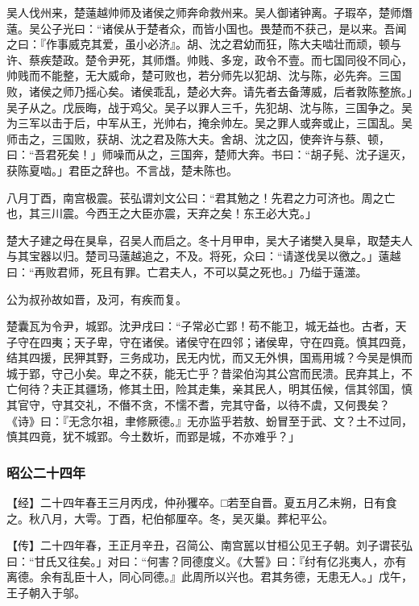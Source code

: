 \documentclass[]{article}
\begin{document}
吴人伐州来，楚薳越帅师及诸侯之师奔命救州来。吴人御诸钟离。子瑕卒，楚师熸薳。吴公子光曰：``诸侯从于楚者众，而皆小国也。畏楚而不获己，是以来。吾闻之曰：『作事威克其爱，虽小必济』。胡、沈之君幼而狂，陈大夫啮壮而顽，顿与许、蔡疾楚政。楚令尹死，其师熸。帅贱、多宠，政令不壹。而七国同役不同心，帅贱而不能整，无大威命，楚可败也，若分师先以犯胡、沈与陈，必先奔。三国败，诸侯之师乃摇心矣。诸侯乖乱，楚必大奔。请先者去备薄威，后者敦陈整旅。」吴子从之。戊辰晦，战于鸡父。吴子以罪人三千，先犯胡、沈与陈，三国争之。吴为三军以击于后，中军从王，光帅右，掩余帅左。吴之罪人或奔或止，三国乱。吴师击之，三国败，获胡、沈之君及陈大夫。舍胡、沈之囚，使奔许与蔡、顿，曰：``吾君死矣！」师噪而从之，三国奔，楚师大奔。书曰：``胡子髡、沈子逞灭，获陈夏啮。」君臣之辞也。不言战，楚未陈也。

八月丁酉，南宫极震。苌弘谓刘文公曰：``君其勉之！先君之力可济也。周之亡也，其三川震。今西王之大臣亦震，天弃之矣！东王必大克。」

楚大子建之母在狊阜，召吴人而启之。冬十月甲申，吴大子诸樊入狊阜，取楚夫人与其宝器以归。楚司马薳越追之，不及。将死，众曰：``请遂伐吴以徼之。」薳越曰：``再败君师，死且有罪。亡君夫人，不可以莫之死也。」乃缢于薳澨。

公为叔孙故如晋，及河，有疾而复。

楚囊瓦为令尹，城郢。沈尹戌曰：``子常必亡郢！苟不能卫，城无益也。古者，天子守在四夷；天子卑，守在诸侯。诸侯守在四邻；诸侯卑，守在四竟。慎其四竟，结其四援，民狎其野，三务成功，民无内忧，而又无外惧，国焉用城？今吴是惧而城于郢，守己小矣。卑之不获，能无亡乎？昔梁伯沟其公宫而民溃。民弃其上，不亡何待？夫正其疆场，修其土田，险其走集，亲其民人，明其伍候，信其邻国，慎其官守，守其交礼，不僭不贪，不懦不耆，完其守备，以待不虞，又何畏矣？《诗》曰：『无念尔祖，聿修厥德。』无亦监乎若敖、蚡冒至于武、文？土不过同，慎其四竟，犹不城郢。今土数圻，而郢是城，不亦难乎？」

\hypertarget{header-n2753}{%
\subsubsection{昭公二十四年}\label{header-n2753}}

【经】二十四年春王三月丙戌，仲孙玃卒。□若至自晋。夏五月乙未朔，日有食之。秋八月，大雩。丁酉，杞伯郁厘卒。冬，吴灭巢。葬杞平公。

【传】二十四年春，王正月辛丑，召简公、南宫嚚以甘桓公见王子朝。刘子谓苌弘曰：``甘氏又往矣。」对曰：``何害？同德度义。《大誓》曰：『纣有亿兆夷人，亦有离德。余有乱臣十人，同心同德。』此周所以兴也。君其务德，无患无人。」戊午，王子朝入于邬。
\end{document}
